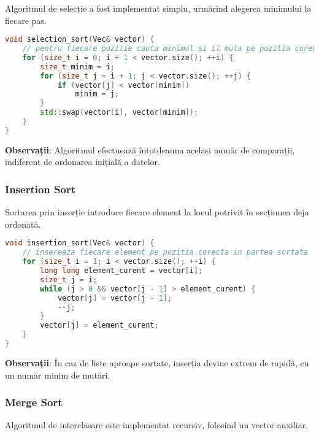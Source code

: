 \documentclass{article}
\begin{document}
Algoritmul de selecție a fost implementat simplu, urmărind alegerea minimului la fiecare pas.

\begin{lstlisting}[language=C++, caption={Selection Sort}, label={lst:selection}]
void selection_sort(Vec& vector) {
    // pentru fiecare pozitie cauta minimul si il muta pe pozitia curenta
    for (size_t i = 0; i + 1 < vector.size(); ++i) {
        size_t minim = i;
        for (size_t j = i + 1; j < vector.size(); ++j) {
            if (vector[j] < vector[minim])
                minim = j;
        }
        std::swap(vector[i], vector[minim]);
    }
}
\end{lstlisting}

\textbf{Observații}: Algoritmul efectuează întotdeauna același număr de comparații, indiferent de ordonarea inițială a datelor.

\vspace{0.5cm}

\subsubsection*{Insertion Sort}

Sortarea prin inserție introduce fiecare element la locul potrivit în secțiunea deja ordonată.

\begin{lstlisting}[language=C++, caption={Insertion Sort}, label={lst:insertion}]
void insertion_sort(Vec& vector) {
    // insereaza fiecare element pe pozitia corecta in partea sortata
    for (size_t i = 1; i < vector.size(); ++i) {
        long long element_curent = vector[i];
        size_t j = i;
        while (j > 0 && vector[j - 1] > element_curent) {
            vector[j] = vector[j - 1];
            --j;
        }
        vector[j] = element_curent;
    }
}
\end{lstlisting}

\textbf{Observații}: În caz de liste aproape sortate, inserția devine extrem de rapidă, cu un număr minim de mutări.

\vspace{0.5cm}
\clearpage

\subsubsection*{Merge Sort}

Algoritmul de interclasare este implementat recursiv, folosind un vector auxiliar.
\end{document}
